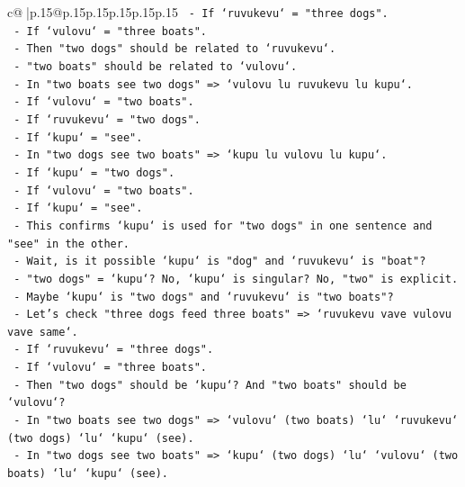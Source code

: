 \documentclass{article}
\begin{document}
{\begin{supertabular}{c@{$\;$}|p{.15\linewidth}@{}p{.15\linewidth}p{.15\linewidth}p{.15\linewidth}p{.15\linewidth}p{.15\linewidth}}
{{{\texttt{                 {-} If `ruvukevu` = "three dogs".} \\
\texttt{                 {-} If `vulovu` = "three boats".} \\
\texttt{                 {-} Then "two dogs" should be related to `ruvukevu`.} \\
\texttt{                 {-} "two boats" should be related to `vulovu`.} \\
\texttt{               {-} In "two boats see two dogs" => `vulovu lu ruvukevu lu kupu`.} \\
\texttt{                 {-} If `vulovu` = "two boats".} \\
\texttt{                 {-} If `ruvukevu` = "two dogs".} \\
\texttt{                 {-} If `kupu` = "see".} \\
\texttt{               {-} In "two dogs see two boats" => `kupu lu vulovu lu kupu`.} \\
\texttt{                 {-} If `kupu` = "two dogs".} \\
\texttt{                 {-} If `vulovu` = "two boats".} \\
\texttt{                 {-} If `kupu` = "see".} \\
\texttt{               {-} This confirms `kupu` is used for "two dogs" in one sentence and "see" in the other.} \\
\texttt{               {-} Wait, is it possible `kupu` is "dog" and `ruvukevu` is "boat"?} \\
\texttt{               {-} "two dogs" = `kupu`? No, `kupu` is singular? No, "two" is explicit.} \\
\texttt{               {-} Maybe `kupu` is "two dogs" and `ruvukevu` is "two boats"?} \\
\texttt{               {-} Let's check "three dogs feed three boats" => `ruvukevu vave vulovu vave same`.} \\
\texttt{                 {-} If `ruvukevu` = "three dogs".} \\
\texttt{                 {-} If `vulovu` = "three boats".} \\
\texttt{                 {-} Then "two dogs" should be `kupu`? And "two boats" should be `vulovu`?} \\
\texttt{                 {-} In "two boats see two dogs" => `vulovu` (two boats) `lu` `ruvukevu` (two dogs) `lu` `kupu` (see).} \\
\texttt{                 {-} In "two dogs see two boats" => `kupu` (two dogs) `lu` `vulovu` (two boats) `lu` `kupu` (see).} \\
}}}
\end{supertabular}}
\end{document}

